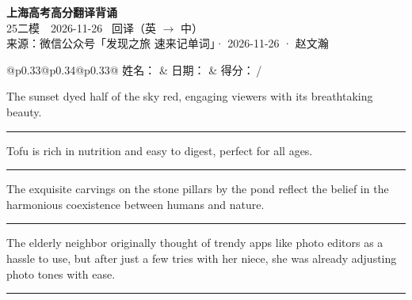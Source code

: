 \documentclass[11pt,a4paper]{article}
\newcommand{\num}[1]{\makebox[1.9em][r]{#1.}\hspace{0.3em}}
\newcommand{\wline}{\noindent\rule{\linewidth}{0.4pt}}
\begin{document}
\pagestyle{plain}
\begin{center}
{\LARGE\bfseries 上海高考高分翻译背诵 }\\[0.25em]
{\large 25二模　2026-11-26 \quad\ 回译（英 $\to$ 中）}\\[0.35em]
{\footnotesize 来源：微信公众号「发现之旅 速来记单词」· 2026-11-26 · 赵文瀚}
\end{center}

\vspace{0.4em}
\noindent\begin{tabular}{@{}p{0.33\textwidth}@{}p{0.34\textwidth}@{}p{0.33\textwidth}@{}}
姓名：\underline{\hspace{2.0cm}} & 日期：\underline{\hspace{2.0cm}} & 得分：\underline{\hspace{1.4cm}}\,/ \\
\end{tabular}

\vspace{0.5em}

\vspace{0.8em}
\num{1}The sunset dyed half of the sky red, engaging viewers with its breathtaking beauty.

\vspace{0.25em}

\wline

\num{2}Tofu is rich in nutrition and easy to digest, perfect for all ages.

\vspace{0.25em}

\wline

\num{3}The exquisite carvings on the stone pillars by the pond reflect the belief in the harmonious coexistence between humans and nature.

\vspace{0.25em}

\wline

\num{4}The elderly neighbor originally thought of trendy apps like photo editors as a hassle to use, but after just a few tries with her niece, she was already adjusting photo tones with ease.

\vspace{0.25em}

\wline
\end{document}
